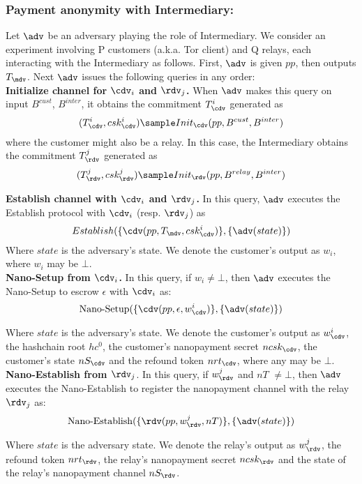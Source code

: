 \subsubsection{Payment anonymity with Intermediary:}
\label{def:anon1}

Let $\adv$ be an adversary playing the role of Intermediary. We consider an experiment involving P customers (a.k.a. Tor client) and Q relays, each interacting with the Intermediary as follows. First, $\adv$ is given $pp$, then outputs $T_\mdv$. Next $\adv$ issues the following queries in any order:\\

\textbf{Initialize channel for $\cdv_i$ and $\rdv_j$.} When $\adv$ makes this query on input $B^{cust}$, $B^{inter}$, it obtains the commitment $T^i_\cdv$ generated as
$$(T^i_\cdv, csk^i_\cdv) \sample Init_\cdv(pp, B^{cust}, B^{inter})$$
where the customer might also be a relay. In this case, the Intermediary obtains the commitment $T^j_\rdv$ generated as $$(T^j_\rdv, csk^j_\rdv) \sample Init_\rdv(pp, B^{relay}, B^{inter})$$

\textbf{Establish channel with $\cdv_i$ and $\rdv_j$.} In this query, $\adv$ executes the Establish protocol with $\cdv_i$ (resp. $\rdv_j$) as
$$Establish(\{\cdv(pp, T_\mdv, csk^i_\cdv)\},\{\adv(state)\})$$
Where $state$ is the adversary's state. We denote the customer's output as $w_i$, where $w_i$ may be $\bot$.\\

\textbf{Nano-Setup from $\cdv_i$.} In this query, if $w_i \neq \bot$, then $\adv$ executes the Nano-Setup to escrow $\epsilon$ with $\cdv_i$ as:
$$\operatorname{Nano-Setup}(\{\cdv(pp, \epsilon, w^i_\cdv)\}, \{\adv(state)\})$$

Where $state$ is the adversary's state. We denote the customer's output as $w^i_\cdv$, the hashchain root $hc^0$, the customer's nanopayment secret $ncsk_\cdv$, the customer's state $nS_\cdv$ and the refound token $nrt_\cdv$, where any may be $\bot$.\\

\textbf{Nano-Establish from $\rdv_j$}. In this query, if $w^j_\rdv$ and $nT$ $\neq \bot$, then $\adv$ executes the Nano-Establish to register the nanopayment channel with the relay $\rdv_j$ as:
$$\operatorname{Nano-Establish}(\{\rdv(pp, w^j_\rdv, nT)\}, \{\adv(state)\})$$

Where $state$ is the adversary state. We denote the relay's output as $w^j_\rdv$, the refound token $nrt_\rdv$, the relay's nanopayment secret $ncsk_\rdv$ and the state of the relay's nanopayment channel $nS_\rdv$. \\


